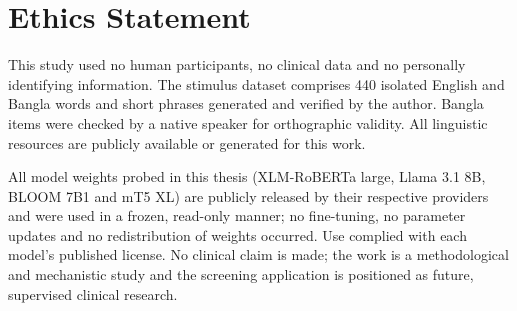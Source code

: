 \section*{Ethics Statement}

This study used no human participants, no clinical data and no personally identifying information. The stimulus dataset comprises 440 isolated English and Bangla words and short phrases generated and verified by the author. Bangla items were checked by a native speaker for orthographic validity. All linguistic resources are publicly available or generated for this work.

All model weights probed in this thesis (XLM-RoBERTa large, Llama 3.1 8B, BLOOM 7B1 and mT5 XL) are publicly released by their respective providers and were used in a frozen, read-only manner; no fine-tuning, no parameter updates and no redistribution of weights occurred. Use complied with each model's published license. No clinical claim is made; the work is a methodological and mechanistic study and the screening application is positioned as future, supervised clinical research.

\pagebreak
